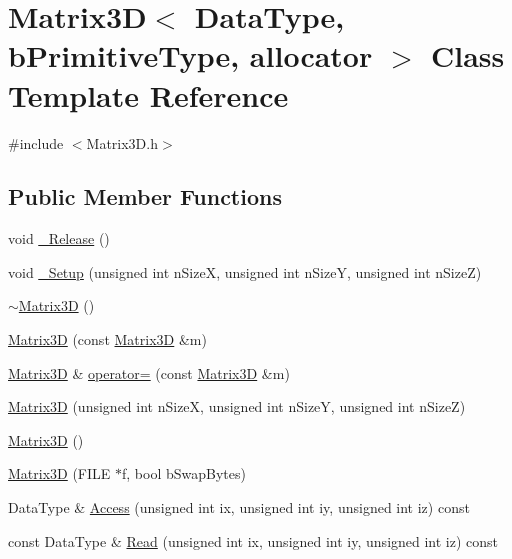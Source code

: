 \hypertarget{class_matrix3_d}{}\section{Matrix3\+D$<$ Data\+Type, b\+Primitive\+Type, allocator $>$ Class Template Reference}
\label{class_matrix3_d}


{\ttfamily \#include $<$Matrix3\+D.\+h$>$}

\subsection*{Public Member Functions}
\begin{DoxyCompactItemize}
\item 
void \hyperlink{class_matrix3_d_abbdd6acc8bee38f2bc25bdff1bacc5f7}{\+\_\+\+Release} ()
\item 
void \hyperlink{class_matrix3_d_a159420c44012651ebd73d308fc9481c1}{\+\_\+\+Setup} (unsigned int n\+Size\+X, unsigned int n\+Size\+Y, unsigned int n\+Size\+Z)
\item 
\hyperlink{class_matrix3_d_a06093895c593605780898674095c8ea2}{$\sim$\+Matrix3\+D} ()
\item 
\hyperlink{class_matrix3_d_a33adec3fea79776994db7e67ddf6ad57}{Matrix3\+D} (const \hyperlink{class_matrix3_d}{Matrix3\+D} \&m)
\item 
\hyperlink{class_matrix3_d}{Matrix3\+D} \& \hyperlink{class_matrix3_d_afbdb57acaf83bcd05708f3a8da9779c3}{operator=} (const \hyperlink{class_matrix3_d}{Matrix3\+D} \&m)
\item 
\hyperlink{class_matrix3_d_a2c3146e7a44fdfc7fa7c290336440ca9}{Matrix3\+D} (unsigned int n\+Size\+X, unsigned int n\+Size\+Y, unsigned int n\+Size\+Z)
\item 
\hyperlink{class_matrix3_d_a2aebeb5dfb1bfbb36530558ff75882f4}{Matrix3\+D} ()
\item 
\hyperlink{class_matrix3_d_a3c295d69dbcfff4b8f6051b5d0f00fd1}{Matrix3\+D} (F\+I\+L\+E $\ast$f, bool b\+Swap\+Bytes)
\item 
Data\+Type \& \hyperlink{class_matrix3_d_afd365350a07f54220264968e3dade5c0}{Access} (unsigned int ix, unsigned int iy, unsigned int iz) const 
\item 
const Data\+Type \& \hyperlink{class_matrix3_d_a2a5ab3a28925a3b2dcc7011d0d8c18d6}{Read} (unsigned int ix, unsigned int iy, unsigned int iz) const 
\item 

\end{DoxyCompactItemize}
